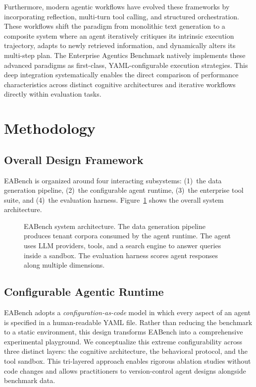 \documentclass[journal,dvipsnames]{acmart}
\begin{document}
Furthermore, modern agentic workflows have evolved these frameworks by incorporating reflection, multi-turn tool calling, and structured orchestration. These workflows shift the paradigm from monolithic text generation to a composite system where an agent iteratively critiques its intrinsic execution trajectory, adapts to newly retrieved information, and dynamically alters its multi-step plan. The Enterprise Agentics Benchmark natively implements these advanced paradigms as first-class, YAML-configurable execution strategies. This deep integration systematically enables the direct comparison of performance characteristics across distinct cognitive architectures and iterative workflows directly within evaluation tasks.

\section{Methodology}
\label{sec:method}

\subsection{Overall Design Framework}
\label{sec:overall}


EABench is organized around four interacting subsystems:
(1)~the data generation pipeline,
(2)~the configurable agent runtime,
(3)~the enterprise tool suite, and
(4)~the evaluation harness.
Figure~\ref{fig:arch} shows the overall system architecture.

\begin{figure}[t]
\centering
\resizebox{0.9\textwidth}{!}{}
\caption{EABench system architecture.  The data generation pipeline produces
tenant corpora consumed by the agent runtime.  The agent uses LLM providers,
tools, and a search engine to answer queries inside a sandbox.  The evaluation
harness scores agent responses along multiple dimensions.}
\label{fig:arch}
\end{figure}

\subsection{Configurable Agentic Runtime}
\label{sec:agentconfig}

EABench adopts a \emph{configuration-as-code} model in which every aspect of an agent is specified in a human-readable YAML file. Rather than reducing the benchmark to a static environment, this design transforms EABench into a comprehensive experimental playground. We conceptualize this extreme configurability across three distinct layers: the cognitive architecture, the behavioral protocol, and the tool sandbox. This tri-layered approach enables rigorous ablation studies without code changes and allows practitioners to version-control agent designs alongside benchmark data.
\end{document}
